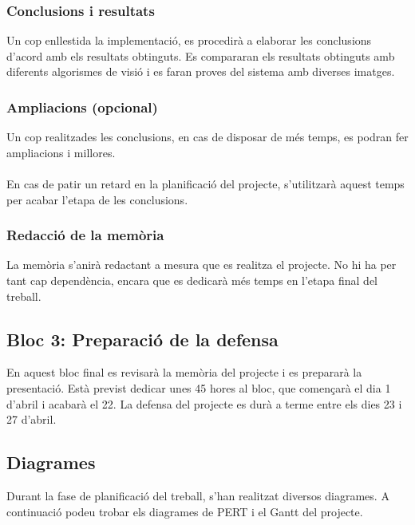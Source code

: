 		\subsubsection{Conclusions i resultats}
			Un cop enllestida la implementació, es procedirà a elaborar les conclusions d'acord amb els resultats obtinguts. Es compararan els resultats obtinguts amb diferents algorismes de visió i es faran
			proves del sistema amb diverses imatges.
		\subsubsection{Ampliacions (opcional)}
			Un cop realitzades les conclusions, en cas de disposar de més temps, es podran fer ampliacions i millores.\\\\
			En cas de patir un retard en la planificació del projecte, s'utilitzarà aquest temps per acabar l'etapa de les conclusions.
		\subsubsection{Redacció de la memòria}
			La memòria s'anirà redactant a mesura que es realitza el projecte. No hi ha per tant cap dependència, encara que es dedicarà més temps en l'etapa final del treball.\\

	\subsection{Bloc 3: Preparació de la defensa}
	En aquest bloc final es revisarà la memòria del projecte i es prepararà la presentació. Està previst dedicar unes 45 hores al bloc, que començarà el dia 1 d'abril i acabarà el 22. %
	La defensa del projecte es durà a terme entre els dies 23 i 27 d'abril. %

	\subsection{Diagrames}
		Durant la fase de planificació del treball, s'han realitzat diversos diagrames. A continuació podeu trobar els diagrames de PERT i el Gantt del projecte.\\ %

